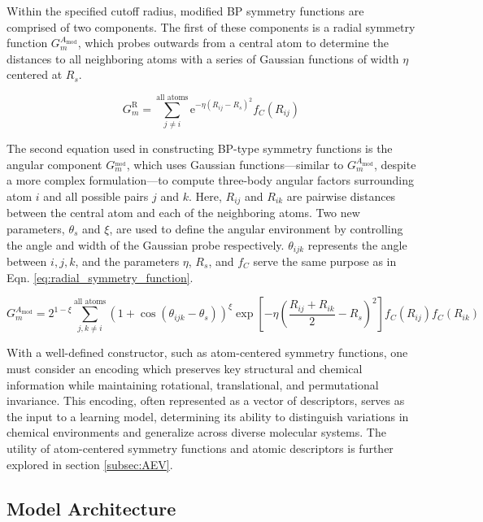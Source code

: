 Within the specified cutoff radius, modified BP symmetry functions are comprised of two components. 
The first of these components is a radial symmetry function $G^{A_{\text{mod}}}_m$, which probes outwards from a central atom to determine the distances to all neighboring atoms with a series of Gaussian functions of width $\eta$ centered at $R_s$.

\begin{equation}
  G_{m}^{\text{R}} = \sum_{j \neq i}^{\text{all atoms}} \mathrm{e}^{-\eta (R_{ij} - R_{s})^2} f_{C}(R_{ij})
  \label{eq:radial_symmetry_function}
\end{equation}

The second equation used in constructing BP-type symmetry functions is the angular component $G^{_{\text{mod}}}_m$, which uses Gaussian functions---similar to $G^{A_{\text{mod}}}_m$, despite a more complex formulation---to compute three-body angular factors surrounding atom $i$ and all possible pairs $j$ and $k$. 
Here, $R_{ij}$ and $R_{ik}$ are pairwise distances between the central atom and each of the neighboring atoms. 
Two new parameters, $\theta_{s}$ and $\xi$, are used to define the angular environment by controlling the angle and width of the Gaussian probe respectively. 
$\theta_{ijk}$ represents the angle between $i,j,k$, and the parameters $\eta$, $R_s$, and $f_C$ serve the same purpose as in Eqn. \ref{eq:radial_symmetry_function}.

\begin{equation}
    G^{A_{\text{mod}}}_m = 2^{1-\xi} \sum_{j,k \neq i}^{\text{all atoms}} \left( 1 + \cos(\theta_{ijk} - \theta_s) \right)^\xi \exp \left[ -\eta \left( \frac{R_{ij} + R_{ik}}{2} - R_s \right)^2 \right] f_C(R_{ij}) f_C(R_{ik})
    \label{eq:angular_symmetry_function}
\end{equation}

With a well-defined constructor, such as atom-centered symmetry functions, one must consider an encoding which preserves key structural and chemical information while maintaining rotational, translational, and permutational invariance.
This encoding, often represented as a vector of descriptors, serves as the input to a learning model, determining its ability to distinguish variations in chemical environments and generalize across diverse molecular systems.
The utility of atom-centered symmetry functions and atomic descriptors is further explored in section \ref{subsec:AEV}.


\subsection{Model Architecture}
\label{subsec:ML_model_architecture}


